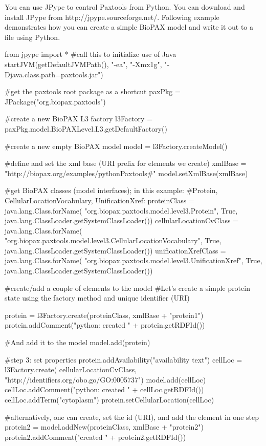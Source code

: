 \documentclass{tufte-book}
\begin{document}
You can use JPype to control Paxtools from Python. You can download and install JPype from http://jpype.sourceforge.net/. Following example demonstrates how you can create a simple BioPAX model and write it out to a file using Python. 
\begin{fullwidth}
\begin{pythoncode}
from jpype import *
#call this to initialize use of Java
startJVM(getDefaultJVMPath(), "-ea", "-Xmx1g", "-Djava.class.path=paxtools.jar")

#get the paxtools root package as a shortcut
paxPkg = JPackage("org.biopax.paxtools")

#create a new BioPAX L3 factory
l3Factory = paxPkg.model.BioPAXLevel.L3.getDefaultFactory()

#create a new empty BioPAX model
model = l3Factory.createModel()

#define and set the xml base (URI prefix for elements we create)
xmlBase = "http://biopax.org/examples/pythonPaxtools#"
model.setXmlBase(xmlBase)

#get BioPAX classes (model interfaces); in this example: 
#Protein, CellularLocationVocabulary, UnificationXref:
proteinClass = java.lang.Class.forName(
 "org.biopax.paxtools.model.level3.Protein", 
 True, java.lang.ClassLoader.getSystemClassLoader())
cellularLocationCvClass = java.lang.Class.forName(
 "org.biopax.paxtools.model.level3.CellularLocationVocabulary", 
 True, java.lang.ClassLoader.getSystemClassLoader())
unificationXrefClass = java.lang.Class.forName( 
 "org.biopax.paxtools.model.level3.UnificationXref",
 True, java.lang.ClassLoader.getSystemClassLoader())

#create/add a couple of elements to the model
#Let's create a simple protein state using the factory method and unique identifier (URI)

protein = l3Factory.create(proteinClass, xmlBase + "protein1")
protein.addComment("python: created " + protein.getRDFId())

#And add it to the model
model.add(protein)

#step 3: set properties
protein.addAvailability("availability text")
cellLoc = l3Factory.create(
 cellularLocationCvClass, "http://identifiers.org/obo.go/GO:0005737")
model.add(cellLoc)
cellLoc.addComment("python: created " + cellLoc.getRDFId())
cellLoc.addTerm("cytoplasm")
protein.setCellularLocation(cellLoc)

#alternatively, one can create, set the id (URI), and add the element in one step
protein2 = model.addNew(proteinClass, xmlBase + "protein2")
protein2.addComment("created " + protein2.getRDFId())
\end{pythoncode}



\end{fullwidth}
\end{document}
